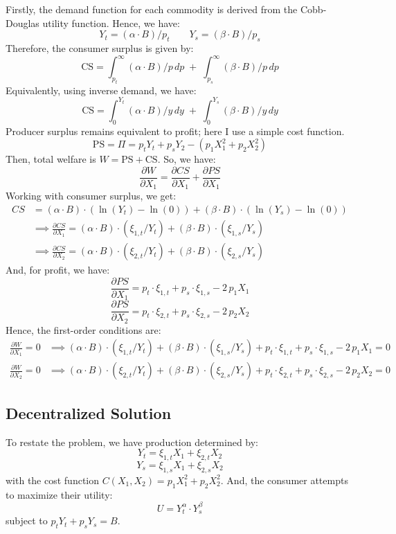 \documentclass[12pt,a4paper]{extarticle}
\begin{document}
Firstly, the demand function for each commodity is derived from the Cobb-Douglas utility function. Hence, we have:
$$Y_t = (\alpha \cdot B)/p_t \qquad Y_s = (\beta \cdot B)/p_s$$
Therefore, the consumer surplus is given by:
$$\text{CS} = \int_{p_t}^{\infty} (\alpha \cdot B)/p \,dp \; + \; \int_{p_s}^{\infty} (\beta \cdot B)/p \,dp$$
Equivalently, using inverse demand, we have:
$$\text{CS} = \int_{0}^{Y_t} (\alpha \cdot B)/y \,dy \; + \; \int_{0}^{Y_s} (\beta \cdot B)/y \,dy$$
Producer surplus remains equivalent to profit; here I use a simple cost function. 
$$\text{PS} = \Pi = p_t Y_t + p_s Y_2 - ( p_1 X_1^2 + p_2 X_2^2)$$
Then, total welfare is $W = \text{PS} + \text{CS}$. So, we have:
$$\frac{\partial W}{\partial X_1} = \frac{\partial CS}{\partial X_1} + \frac{\partial PS}{\partial X_1} $$
Working with consumer surplus, we get:
\begin{align*}
CS &= (\alpha \cdot B) \cdot (\ln(Y_t) - \ln(0)) + (\beta \cdot B) \cdot (\ln(Y_s) - \ln(0)) \\
&\implies  \frac{\partial CS}{\partial X_1} = (\alpha \cdot B) \cdot (\xi_{1,t} / Y_t) + (\beta \cdot B) \cdot (\xi_{1,s} / Y_s)\\
&\implies  \frac{\partial CS}{\partial X_2} = (\alpha \cdot B) \cdot (\xi_{2,t} / Y_t) + (\beta \cdot B) \cdot (\xi_{2,s} / Y_s)
\end{align*}
And, for profit, we have:
$$ \frac{\partial PS}{\partial X_1} = p_t \cdot \xi_{1,t} + p_s \cdot \xi_{1,s} - 2\, p_1 X_1 $$
$$ \frac{\partial PS}{\partial X_2} = p_t \cdot \xi_{2,t} + p_s \cdot \xi_{2,s} - 2\, p_2 X_2 $$
Hence, the first-order conditions are:
\begin{align*}
\frac{\partial W}{\partial X_1} = 0 &\implies (\alpha \cdot B) \cdot (\xi_{1,t} / Y_t) + (\beta \cdot B) \cdot (\xi_{1,s} / Y_s) + p_t \cdot \xi_{1,t} + p_s \cdot \xi_{1,s} - 2\, p_1 X_1 = 0 \\
\frac{\partial W}{\partial X_2} = 0 &\implies (\alpha \cdot B) \cdot (\xi_{2,t} / Y_t) + (\beta \cdot B) \cdot (\xi_{2,s} / Y_s) + p_t \cdot \xi_{2,t} + p_s \cdot \xi_{2,s} - 2\, p_2 X_2 = 0
\end{align*}


\subsection{Decentralized Solution}

To restate the problem, we have production determined by:
$$Y_t = \xi_{1,t} X_1 + \xi_{2,t} X_2$$
$$Y_s = \xi_{1,s} X_1 + \xi_{2,s} X_2$$
with the cost function $C(X_1, X_2) = p_1 X_1^2 + p_2 X_2^2$. And, the consumer attempts to maximize their utility:
$$U = Y_t^\alpha \cdot Y_s^\beta$$  
subject to $p_t Y_t + p_s Y_s = B$. 
\end{document}
